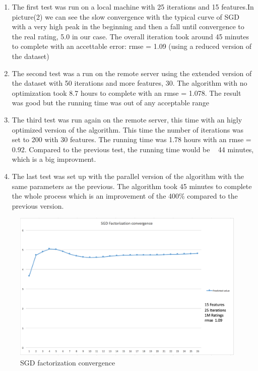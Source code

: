 \documentclass{sig-alternate-05-2015}
\begin{document}
\begin{enumerate}
  \item The first test was run on a local machine with 25 iterations and 15 features.In picture(2) we can see the slow convergence with the typical curve of SGD with a
  very high peak in the beginning and then a fall until convergence to the real rating, 5.0 in our case. The overall iteration took around 45 minutes to complete with an
  accettable error: rmse = 1.09 (using a reduced version of the dataset)
  \item The second test was a run on the remote server using the extended version of the dataset with  50 iterations and more features, 30. The algorithm with no optimization
  took 8.7 hours to complete with an rmse = 1.078. The result was good but the running time was out of any acceptable range
  \item The third test was run again on the remote server, this time with an higly optimized version of the algorithm. This time the number of iterations was set to 200 with 30 features.
  The running time was 1.78 hours with an rmse = 0.92. Compared to the previous test, the running time would be ~ 44 minutes, which is a big improvment.
  \item The last test was set up with the parallel version of the algorithm with the same parameters as the previous. The algorithm took 45 minutes to complete the whole process
  which is an improvement of the 400$\%$ compared to the previous version.
\end{enumerate}
\begin{figure}
    \caption{SGD factorization convergence}
    \centering
    \includegraphics[scale=0.175]{chart.png}
\end{figure}
\end{document}
